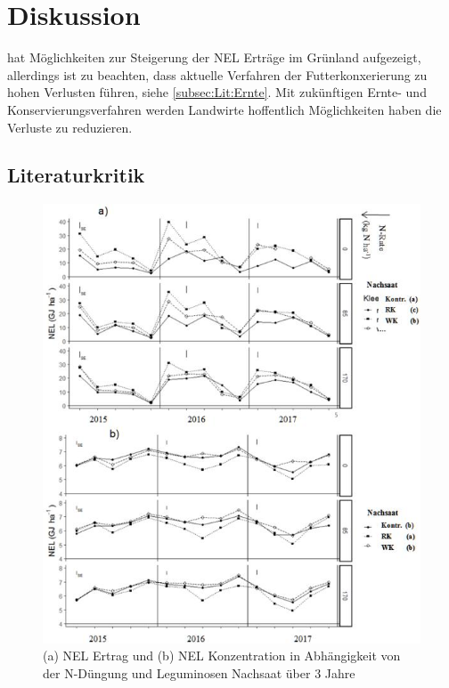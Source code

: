 
\section{Diskussion}
\label{sec:Disukussion}
\textcite[33-36]{weggler2050leguminosen} hat Möglichkeiten zur Steigerung der \ac{NEL} Erträge im Grünland aufgezeigt, allerdings ist zu beachten, dass aktuelle Verfahren der Futterkonxerierung zu hohen Verlusten führen, siehe \cref{subsec:Lit:Ernte}. 
Mit zukünftigen Ernte- und Konservierungsverfahren werden Landwirte hoffentlich Möglichkeiten haben die Verluste zu reduzieren.

\subsection{Literaturkritik}
\label{sub:kritik}

\begin{figure}
	\includegraphics[scale=0.5]{images/wegglerAbb1}
	\caption[(a) \acs{NEL} Ertrag und (b) \acs{NEL} Konzentration in Abhängigkeit von der N-Düngung und Leguminosen Nachsaat über 3 Jahre]{(a) \ac{NEL} Ertrag und (b) \ac{NEL} Konzentration in Abhängigkeit von der N-Düngung und Leguminosen Nachsaat über 3 Jahre \parencite[35]{weggler2050leguminosen}}
	\label{fig:wegglerAbb1}
\end{figure}

